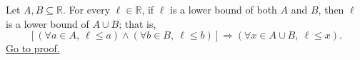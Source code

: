 \begin{lemma}
\label{lem:union-preserves-lower-bounds}
Let $A,B\subseteq\mathbb{R}$. For every $\ell\in\mathbb{R}$, if $\ell$ is
a lower bound of both $A$ and $B$, then $\ell$ is a lower bound of
$A\cup B$; that is,
\[
\left[
(\forall a\in A,\ \ell\leq a)
\land
(\forall b\in B,\ \ell\leq b)
\right]
\Longrightarrow
(\forall x\in A\cup B,\ \ell\leq x).
\]
\hyperref[prf:union-preserves-lower-bounds]{Go to proof.}
\end{lemma}